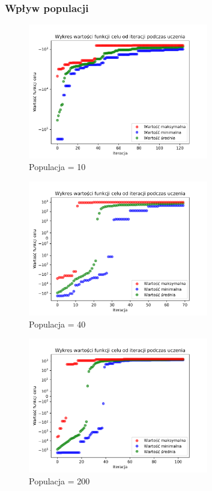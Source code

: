 \documentclass[a4paper]{article}
\begin{document}
\subsubsection{Wpływ populacji}
\begin{figure}[H]
    \centering
    \includegraphics[width=0.7\textwidth]{plots/population_10.pdf}
    \caption{Populacja = 10}
    \label{fig:population_10}
\end{figure}

\begin{figure}[H]
    \centering
    \includegraphics[width=0.7\textwidth]{plots/population_40.pdf}
    \caption{Populacja = 40}
    \label{fig:population_40}
\end{figure}

\begin{figure}[H]
    \centering
    \includegraphics[width=0.7\textwidth]{plots/population_200.pdf}
    \caption{Populacja = 200}
    \label{fig:population_200}
\end{figure}
\end{document}
